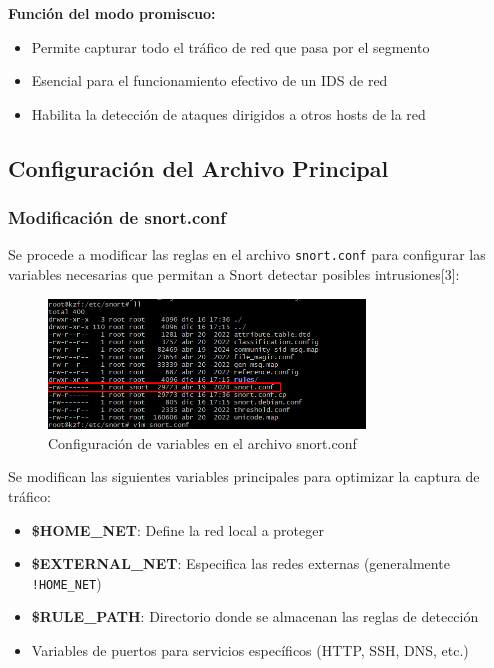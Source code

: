 \documentclass[12pt,a4paper]{article}
\begin{document}
\textbf{Función del modo promiscuo:}
\begin{itemize}
  \item Permite capturar todo el tráfico de red que pasa por el segmento
  \item Esencial para el funcionamiento efectivo de un IDS de red
  \item Habilita la detección de ataques dirigidos a otros hosts de la red
\end{itemize}

\subsection{Configuración del Archivo Principal}

\subsubsection{Modificación de snort.conf}

Se procede a modificar las reglas en el archivo \texttt{snort.conf} para
configurar las variables necesarias que permitan a Snort detectar posibles
intrusiones[3]:

\begin{figure}[H]
  \centering
  \includegraphics[width=0.75\textwidth]{./assets/img13.png}
  \caption{Configuración de variables en el archivo snort.conf}
  \label{fig:snort-conf}
\end{figure}

Se modifican las siguientes variables principales para optimizar la captura de
tráfico:

\begin{itemize}
  \item \textbf{\$HOME\_NET}: Define la red local a proteger
  \item \textbf{\$EXTERNAL\_NET}: Especifica las redes externas (generalmente \texttt{!HOME\_NET})
  \item \textbf{\$RULE\_PATH}: Directorio donde se almacenan las reglas de detección
  \item Variables de puertos para servicios específicos (HTTP, SSH, DNS, etc.)
\end{itemize}
\end{document}
